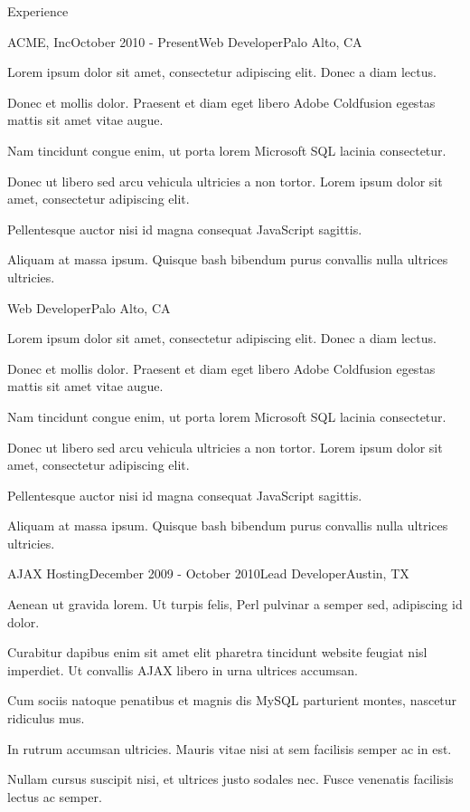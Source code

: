 \documentclass{resume} %
\begin{document}
\begin{rSection}{Experience}

\begin{rSubsection}{ACME, Inc}{October 2010 - Present}{Web Developer}{Palo Alto, CA}
\item Lorem ipsum dolor sit amet, consectetur adipiscing elit. Donec a diam lectus.
\item Donec et mollis dolor. Praesent et diam eget libero Adobe Coldfusion egestas mattis sit amet vitae augue.
\item Nam tincidunt congue enim, ut porta lorem Microsoft SQL lacinia consectetur.
\item Donec ut libero sed arcu vehicula ultricies a non tortor. Lorem ipsum dolor sit amet, consectetur adipiscing elit.
\item Pellentesque auctor nisi id magna consequat JavaScript sagittis.
\item Aliquam at massa ipsum. Quisque bash bibendum purus convallis nulla ultrices ultricies.
\end{rSubsection}
\vspace{-1\baselineskip}
\begin{rSubsection}{}{}{Web Developer}{Palo Alto, CA}
	\item Lorem ipsum dolor sit amet, consectetur adipiscing elit. Donec a diam lectus.
	\item Donec et mollis dolor. Praesent et diam eget libero Adobe Coldfusion egestas mattis sit amet vitae augue.
	\item Nam tincidunt congue enim, ut porta lorem Microsoft SQL lacinia consectetur.
	\item Donec ut libero sed arcu vehicula ultricies a non tortor. Lorem ipsum dolor sit amet, consectetur adipiscing elit.
	\item Pellentesque auctor nisi id magna consequat JavaScript sagittis.
	\item Aliquam at massa ipsum. Quisque bash bibendum purus convallis nulla ultrices ultricies.
\end{rSubsection}


\begin{rSubsection}{AJAX Hosting}{December 2009 - October 2010}{Lead Developer}{Austin, TX}
\item Aenean ut gravida lorem. Ut turpis felis, Perl pulvinar a semper sed, adipiscing id dolor.
\item Curabitur dapibus enim sit amet elit pharetra tincidunt website feugiat nisl imperdiet. Ut convallis AJAX libero in urna ultrices accumsan.
\item Cum sociis natoque penatibus et magnis dis MySQL parturient montes, nascetur ridiculus mus.
\item In rutrum accumsan ultricies. Mauris vitae nisi at sem facilisis semper ac in est.
\item Nullam cursus suscipit nisi, et ultrices justo sodales nec. Fusce venenatis facilisis lectus ac semper.
\end{rSubsection}


\end{rSection}
\end{document}
